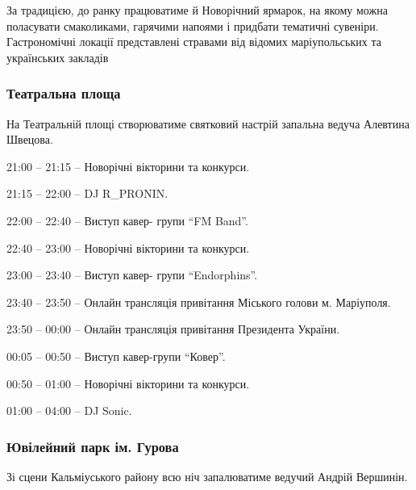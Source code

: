 
За традицією, до ранку працюватиме й Новорічний ярмарок, на якому можна
поласувати смаколиками, гарячими напоями і придбати тематичні сувеніри.
Гастрономічні локації представлені стравами від відомих маріупольських та
українських закладів


\subsubsection{Театральна площа}

На Театральній площі створюватиме святковий настрій запальна ведуча Алевтина
Швецова.


21:00 – 21:15 – Новорічні вікторини та конкурси.

21:15 – 22:00 – DJ R\_PRONIN.\par
22:00 – 22:40 – Виступ кавер- групи \enquote{FM Band}.\par
22:40 – 23:00 – Новорічні вікторини та конкурси.\par
23:00 – 23:40 – Виступ кавер- групи \enquote{Endorphins}.\par
23:40 – 23:50 – Онлайн трансляція привітання Міського голови м. Маріуполя.\par
23:50 – 00:00 – Онлайн трансляція привітання Президента України.\par
00:05 – 00:50 – Виступ кавер-групи \enquote{Ковер}.\par
00:50 – 01:00 – Новорічні вікторини та конкурси.\par
01:00 – 04:00 – DJ Sonic.\par


\subsubsection{Ювілейний парк ім. Гурова}

Зі сцени Кальміуського району всю ніч запалюватиме ведучий Андрій Вершинін.


